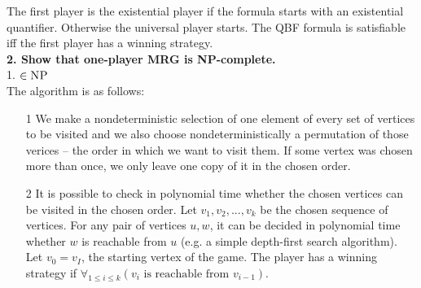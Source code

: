 The first player is the existential player if the formula starts with an existential quantifier.
Otherwise the universal player starts.
The QBF formula is satisfiable iff the first player has a winning strategy.\\

\noindent
\textbf{2. Show that one-player MRG is NP-complete.}\\
1. \underline{$\in \textsc{NP}$}\\
The algorithm is as follows:\\
\begin{itemize}
      \item[1] We make a nondeterministic selection of one element of every set of vertices to be visited
               and we also choose nondeterministically a permutation of those verices -- the order in which
               we want to visit them. If some vertex was chosen more than once, we only leave one copy of it
               in the chosen order.
      \item[2] It is possible to check in polynomial time whether the chosen vertices can be visited in the
               chosen order. Let $v_1, v_2, ..., v_k$ be the chosen sequence of vertices. For any pair of
               vertices $u, w$, it can be decided in polynomial time whether $w$ is reachable from $u$
               (e.g. a simple depth-first search algorithm). Let $v_0 = v_I$, the starting vertex of the game.
               The player has a winning strategy if $\forall_{1 \leq i \leq k}(v_i \text{ is reachable from } v_{i-1})$.
\end{itemize}

